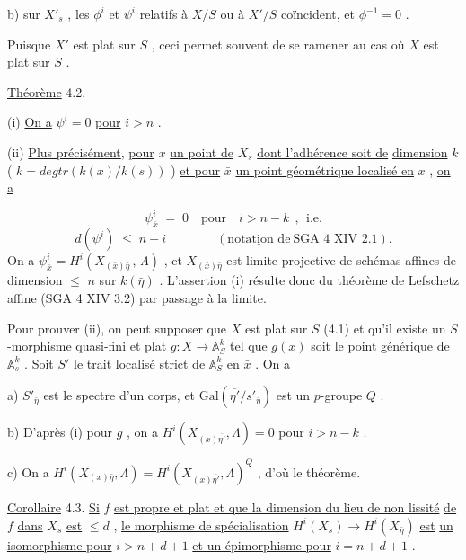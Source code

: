 
b) sur  $X'_s$ , les  $\phi^i$  et  $\psi^i$  relatifs à  $X/S$  ou à  $X'/S$  coïncident, et  $\phi^{-1} = 0$ .

Puisque  $X'$  est plat sur  $S$ , ceci permet souvent de se ramener au cas où  $X$  est plat sur  $S$ .

\underline{Théorème} 4.2.

(i) \underline{On a}  $\psi^i = 0$  \underline{pour}  $i > n$ .

(ii) \underline{Plus précisément}, \underline{pour}  $x$  \underline{un point de}  $X_s$ \underline{dont l'adhérence soit de} \underline{dimension}  $k$  ( $k = deg tr(k(x)/k(s))$ ) \underline{et pour}  $\bar{x}$  \underline{un point géométrique localisé en} $x$ , \underline{on a}

\begin{equation*}
\psi^i_{\bar{x}} \;=\; 0 \quad \underline{\text{pour}} \quad i > n-k \;\, , \;\, \text{i.e.}
\end{equation*}
\begin{equation*}
d(\psi^i) \;\leqslant\; n-i \qquad\qquad (\underline{\text{notation de}}\ \text{SGA 4 XIV 2.1}).
\end{equation*}
On a  $\psi^i_{\bar{x}} = H^i(X_{(\bar{x})\bar\eta}\, ,\, \Lambda)$ , et  $X_{(\bar{x})\bar\eta}$  est limite projective de schémas affines de dimension  $\leqslant$  $n$ sur  $k(\bar\eta)$ . L'assertion (i) résulte donc du théorème de Lefschetz affine (SGA 4 XIV 3.2) par passage à la limite.

Pour prouver (ii), on peut supposer que  $X$  est plat sur  $S$  (4.1) et qu'il existe un  $S$-morphisme quasi-fini et plat  $g : X \longrightarrow \mathbb{A}^k_S$  tel que  $g(x)$  soit le point générique de  $\mathbb{A}^k_s$ . Soit  $S'$  le trait localisé strict de  $\mathbb{A}^k_S$  en  $\bar{x}$ . On a

a) $S'_{\bar\eta}$  est le spectre d'un corps, et  $\mathrm{Gal}(\overline{\eta'}/s'_{\bar\eta})$  est un $p$-groupe  $Q$ .

b) D'après (i) pour  $g$ , on a  $H^i(X_{(x)\overline{\eta'}},\Lambda) = 0$  pour  $i > n-k$ .

c) On a  $H^i(X_{(x)\bar\eta},\Lambda) = H^i(X_{(x)\overline{\eta'}},\Lambda)^Q$  , d'où le théorème.

\underline{Corollaire} 4.3.  \underline{Si}  $f$  \underline{est propre et plat et que la dimension du lieu de non lissité} \underline{de}  $f$  \underline{dans}  $X_s$  \underline{est}  $\leqslant d$ , \underline{le morphisme de spécialisation}  $H^i(X_s) \longrightarrow H^i(X_{\bar\eta})$  \underline{est} \underline{un isomorphisme pour}  $i > n+d+1$  \underline{et un épimorphisme pour}  $i = n+d+1$ .

